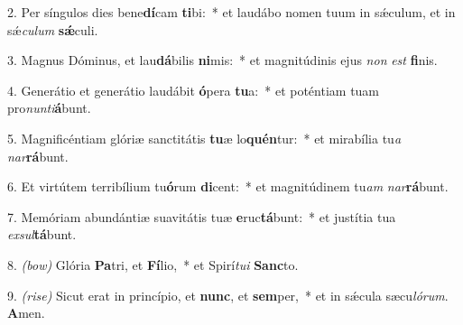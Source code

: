 2. Per síngulos dies bene\textbf{dí}cam \textbf{ti}bi:~* et laudábo nomen tuum in s\'{\ae}culum, et in s\'{\ae}\textit{cu}\textit{lum} \textbf{s\'{\ae}}culi.

3. Magnus Dóminus, et lau\textbf{dá}bilis \textbf{ni}mis:~* et magnitúdinis ejus \textit{non} \textit{est} \textbf{fi}nis.

4. Generátio et generátio laudábit \textbf{ó}pera \textbf{tu}a:~* et poténtiam tuam pro\textit{nun}\textit{ti}\textbf{á}bunt.

5. Magnificéntiam glóriæ sanctitátis \textbf{tu}æ lo\textbf{quén}tur:~* et mirabília tu\textit{a} \textit{nar}\textbf{rá}bunt.

6. Et virtútem terribílium tu\textbf{ó}rum \textbf{di}cent:~* et magnitúdinem tu\textit{am} \textit{nar}\textbf{rá}bunt.

7. Memóriam abundántiæ suavitátis tuæ \textbf{e}ruc\textbf{tá}bunt:~* et justítia tua \textit{ex}\textit{sul}\textbf{tá}bunt.

8. {\color{red}\textit{(bow)}} Glória \textbf{Pa}tri, et \textbf{Fí}lio,~* et Spirí\textit{tu}\textit{i} \textbf{Sanc}to.

9. {\color{red}\textit{(rise)}} Sicut erat in princípio, et \textbf{nunc}, et \textbf{sem}per,~* et in s\'{\ae}cula sæcu\textit{ló}\textit{rum}. \textbf{A}men.
